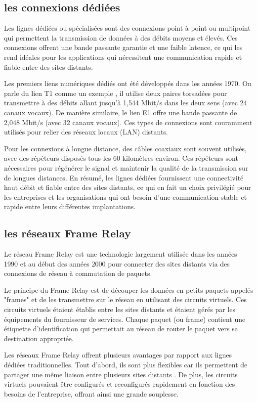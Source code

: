   \subsection{les connexions dédiées}
  
  Les lignes dédiées ou spécialisées sont des connexions point à point ou multipoint qui permettent la transmission de données à des débits moyens et élevés. Ces connexions offrent une bande passante garantie et une faible latence, ce qui les rend idéales pour les applications qui nécessitent une communication rapide et fiable entre des sites distants.
 
  Les premiers liens numériques dédiés ont été développés dans les années 1970.  On parle du lien T1 comme un exemple , il utilise deux paires torsadées pour transmettre à des débits allant jusqu'à 1,544 Mbit/s dans les deux sens (avec 24 canaux vocaux). De manière similaire, le lien E1 offre une bande passante de 2,048 Mbit/s (avec 32 canaux vocaux). Ces types de connexions sont couramment utilisés pour relier des réseaux locaux (LAN) distants.
  
  Pour les connexions à longue distance, des câbles coaxiaux sont souvent utilisés, avec des répéteurs disposés tous les 60 kilomètres environ. Ces répéteurs sont nécessaires pour régénérer le signal et maintenir la qualité de la transmission sur de longues distances.
  En résumé, les lignes dédiées fournissent une connectivité haut débit et fiable entre des sites distants, ce qui en fait un choix privilégié pour les entreprises et les organisations qui ont besoin d'une communication stable et rapide entre leurs différentes implantations.
  \subsection{les réseaux Frame Relay}
  Le réseau Frame Relay est une technologie largement utilisée dans les années 1990 et au début des années 2000 pour connecter des sites distants via des connexions de réseau à commutation de paquets.
  
  Le principe du Frame Relay est de découper les données en petits paquets appelés "frames" et de les transmettre sur le réseau en utilisant des circuits virtuels. Ces circuits virtuels étaient établis entre les sites distants et étaient gérés par les équipements du fournisseur de services. Chaque paquet (ou frame) contient une étiquette d'identification qui permettait au réseau de router le paquet vers sa destination appropriée.
  
  Les réseaux Frame Relay offrent plusieurs avantages par rapport aux lignes dédiées traditionnelles. Tout d'abord, ils sont plus flexibles car ils permettent de partager une même liaison entre plusieurs sites distants . De plus, les circuits virtuels pouvaient être configurés et reconfigurés rapidement en fonction des besoins de l'entreprise, offrant ainsi une grande souplesse.
